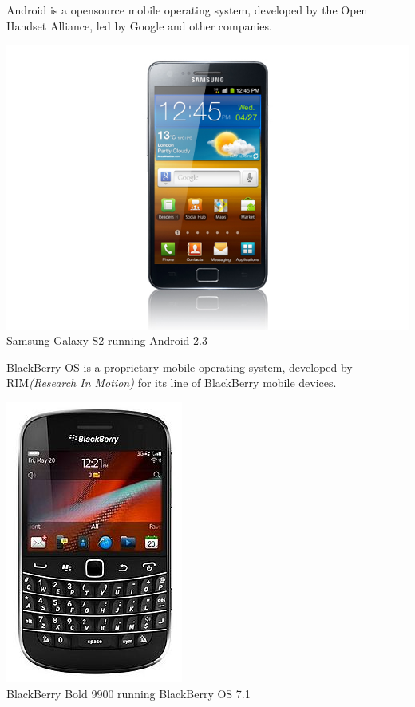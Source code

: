 Android is a opensource mobile operating system, developed by the Open Handset Alliance, led by Google and other companies.\cite{Inc.2012}

\begin{centering}
\includegraphics[scale=0.35]{images/android_sgs2.jpg}\\{Samsung Galaxy S2 running Android 2.3}\\
\end{centering}


BlackBerry OS is a proprietary mobile operating system, developed by RIM\emph{(Research In Motion)} for its line of BlackBerry mobile devices.

\begin{centering}
\includegraphics[scale=0.5]{images/Blackberrybold9900.jpg}\\{BlackBerry Bold 9900 running BlackBerry OS 7.1}\\
\end{centering}


